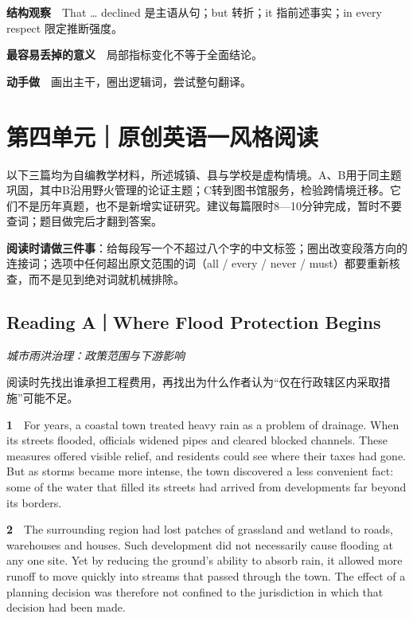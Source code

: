 \documentclass[a4paper,11pt,openany]{report}
\begin{document}
\textbf{结构观察}　That \ldots{} declined 是主语从句；but 转折；it 指前述事实；in every respect 限定推断强度。

\textbf{最容易丢掉的意义}　局部指标变化不等于全面结论。

\textbf{动手做}　画出主干，圈出逻辑词，尝试整句翻译。

\chapter{第四单元｜原创英语一风格阅读}\label{ux7b2cux56dbux5355ux5143ux539fux521bux82f1ux8bedux4e00ux98ceux683cux9605ux8bfb}

以下三篇均为自编教学材料，所述城镇、县与学校是虚构情境。A、B用于同主题巩固，其中B沿用野火管理的论证主题；C转到图书馆服务，检验跨情境迁移。它们不是历年真题，也不是新增实证研究。建议每篇限时8---10分钟完成，暂时不要查词；题目做完后才翻到答案。

\textbf{阅读时请做三件事}：给每段写一个不超过八个字的中文标签；圈出改变段落方向的连接词；选项中任何超出原文范围的词（all / every / never / must）都要重新核查，而不是见到绝对词就机械排除。

\section{Reading A｜Where Flood Protection Begins}\label{reading-awhere-flood-protection-begins}

\emph{城市雨洪治理：政策范围与下游影响}

阅读时先找出谁承担工程费用，再找出为什么作者认为``仅在行政辖区内采取措施''可能不足。

\textbf{1}　For years, a coastal town treated heavy rain as a problem of drainage. When its streets flooded, officials widened pipes and cleared blocked channels. These measures offered visible relief, and residents could see where their taxes had gone. But as storms became more intense, the town discovered a less convenient fact: some of the water that filled its streets had arrived from developments far beyond its borders.

\textbf{2}　The surrounding region had lost patches of grassland and wetland to roads, warehouses and houses. Such development did not necessarily cause flooding at any one site. Yet by reducing the ground's ability to absorb rain, it allowed more runoff to move quickly into streams that passed through the town. The effect of a planning decision was therefore not confined to the jurisdiction in which that decision had been made.
\end{document}
